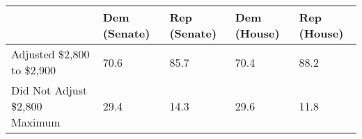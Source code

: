 \begin{tabular}{lllll}
  \toprule
  & Dem (Senate) & Rep (Senate) & Dem (House) & Rep (House) \\ 
  \midrule
Adjusted \$2,800 to \$2,900 & 70.6 & 85.7 & 70.4 & 88.2 \\ 
  Did Not Adjust \$2,800 Maximum & 29.4 & 14.3 & 29.6 & 11.8 \\ 
   \bottomrule
\end{tabular}
